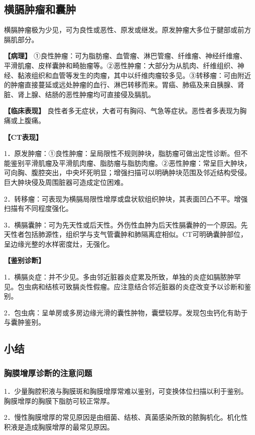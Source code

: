 \subsection{横膈肿瘤和囊肿}

横膈肿瘤极为少见，可为良性或恶性、原发或继发。原发肿瘤大多位于腱部或前方膈肌部分。

\textbf{【病理】}
①良性肿瘤：可为脂肪瘤、血管瘤、淋巴管瘤、纤维瘤、神经纤维瘤、平滑肌瘤、皮样囊肿和畸胎瘤等。②恶性肿瘤：大部分为从肌肉、纤维组织、神经、黏液组织和血管等发生的肉瘤，其中以纤维肉瘤较多见。③转移瘤：可由附近的肿瘤直接蔓延或远处肿瘤的血行、淋巴转移而来。胃癌、肺癌及来自胰腺、肾脏、肾上腺、结肠的恶性肿瘤均可直接侵及膈肌。

\textbf{【临床表现】}
良性者多无症状，大者可有胸闷、气急等症状。恶性者多表现为胸痛或上腹痛。

\textbf{【CT表现】}

1．原发肿瘤：①良性肿瘤：呈局限性不规则肿块，脂肪瘤可做出定性诊断。但不能鉴别平滑肌瘤及平滑肌肉瘤、脂肪瘤与脂肪肉瘤。②恶性肿瘤：常呈巨大肿块，可向胸、腹腔突出，中央坏死明显；增强扫描可以明确肿块范围及邻近结构受侵。巨大肿块侵及周围脏器可造成定位困难。

2．转移瘤：可表现为横膈局限性增厚或盘状软组织肿块，其表面凹凸不平。增强扫描有不同程度强化。

3．横膈囊肿：可为先天性或后天性。外伤性血肿为后天性膈囊肿的一个原因。先天性者包括肺源性，组织学与支气管囊肿和肺隔离症相似。CT可明确囊肿部位，呈边缘光整的水样密度灶，无强化。

\textbf{【鉴别诊断】}

1．横膈炎症：并不少见。多由邻近脏器炎症累及所致，单独的炎症如膈脓肿罕见。包虫病和结核可致膈炎性假瘤。应注意结合邻近脏器的炎症改变予以诊断和鉴别。

2．包虫病：呈单房或多房边缘光滑的囊性肿物，囊壁较厚。发现包虫钙化有助于与囊肿鉴别。

\subsection{小结}

\subsubsection{胸膜增厚诊断的注意问题}

1．少量胸腔积液与胸膜斑和胸膜增厚常难以鉴别，可变换体位扫描以利于鉴别。胸膜增厚的胸膜下脂肪可较正常厚。

2．慢性胸膜增厚的常见原因是由细菌、结核、真菌感染所致的脓胸机化。机化性积液是造成胸膜增厚的最常见原因。

